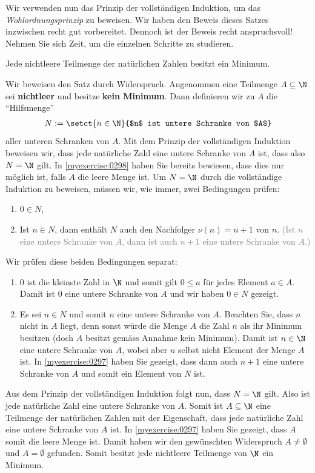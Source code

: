 \noindent
Wir verwenden nun das Prinzip der vollständigen Induktion, um das \textit{Wohlordnungsprinzip} zu beweisen.
Wir haben den Beweis dieses Satzes inzwischen recht gut vorbereitet. Dennoch ist der Beweis recht anspruchsvoll!
Nehmen Sie sich Zeit, um die einzelnen Schritte zu studieren.
\begin{mytheorem}[Wohlordnungsprinzip]\label{mytheorem:MinimumN}
	Jede nichtleere Teilmenge der natürlichen Zahlen besitzt ein Minimum.
\end{mytheorem}
\begin{myproof}
	Wir beweisen den Satz durch Widerspruch. Angenommen eine Teilmenge $A\subseteq\N$ sei \textbf{nichtleer} und besitze \textbf{kein Minimum}. Dann definieren wir zu $A$ die \enquote{Hilfsmenge}
	\begin{align*}
		N := \setct{n\in\N}{$n$ ist untere Schranke von $A$}
	\end{align*}
	aller unteren Schranken von $A$.
	Mit dem Prinzip der vollständigen Induktion beweisen wir, dass jede natürliche Zahl eine untere Schranke von $A$ ist, dass also $N=\N$ gilt.
	In \cref{myexercise:0298} haben Sie bereits bewiesen, dass dies nur möglich ist, falls $A$ die leere Menge ist.
	Um $N = \N$ durch die vollständige Induktion zu beweisen, müssen wir, wie immer, zwei Bedingungen prüfen:
	\begin{enumerate}
		\item $0\in N$,
		\item Ist $n\in N$, dann enthält $N$ auch den Nachfolger $\nu(n) = n+1$ von $n$. \textcolor{Gray}{(Ist $n$ eine untere Schranke von $A$, dann ist auch $n+1$ eine untere Schranke von $A$.)}
	\end{enumerate}
	Wir prüfen diese beiden Bedingungen separat:
	\begin{enumerate}
		\item $0$ ist die kleinste Zahl in $\N$ und somit gilt $0\leq a$ für jedes Element $a\in A$. Damit ist $0$ eine untere Schranke von $A$ und wir haben $0\in N$ gezeigt. \checkmark
		\item Es sei $n\in N$ und somit $n$ eine untere Schranke von $A$. Beachten Sie, dass $n$ nicht in $A$ liegt, denn sonst würde die Menge $A$ die Zahl $n$ als ihr Minimum besitzen (doch $A$ besitzt gemäss Annahme kein Minimum). Damit ist $n\in\N$ eine untere Schranke von $A$, wobei aber $n$ selbst nicht Element der Menge $A$ ist. In \cref{myexercise:0297} haben Sie gezeigt, dass dann auch $n+1$ eine untere Schranke von $A$ und somit ein Element von $N$ ist. \checkmark
	\end{enumerate}
	Aus dem Prinzip der vollständigen Induktion folgt nun, dass $N=\N$ gilt. Also ist jede natürliche Zahl eine untere Schranke von $A$. Somit ist $A\subseteq\N$ eine Teilmenge der natürlichen Zahlen mit der Eigenschaft, dass jede natürliche Zahl eine untere Schranke von $A$ ist. In \cref{myexercise:0297} haben Sie gezeigt, dass $A$ somit die leere Menge ist. Damit haben wir den gewünschten Widerspruch $A\neq\emptyset$ und $A=\emptyset$ gefunden. Somit besitzt jede nichtleere Teilmenge von $\N$ ein Minimum.
\end{myproof}

